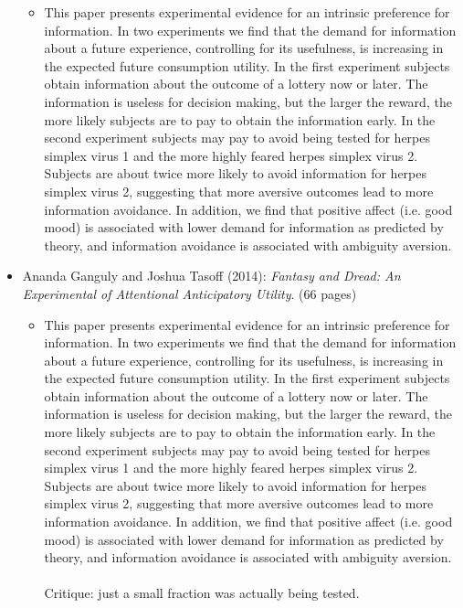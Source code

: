 \begin{itemize}
		\begin{itemize}
			\item This paper presents experimental evidence for an intrinsic preference for information. In two experiments we find that the demand for information about a future experience, controlling for its usefulness, is increasing in the expected future consumption utility. In the first experiment subjects obtain information about the outcome of a lottery now or later. The information is useless for decision making, but the larger the reward, the more likely subjects are to pay to obtain the information early. In the second experiment subjects may pay to avoid being tested for herpes simplex virus 1 and the more highly feared herpes simplex virus 2. Subjects are about twice more likely to avoid information for herpes simplex virus 2, suggesting that more aversive outcomes lead to more information avoidance. In addition, we find that positive affect (i.e. good mood) is associated with lower demand for information as predicted by theory, and information avoidance is associated with ambiguity aversion.
		\end{itemize}
	\item Ananda Ganguly and Joshua Tasoff (2014): \textit{Fantasy and Dread: An Experimental of Attentional Anticipatory Utility}. (66 pages)
		\begin{itemize}
			\item This paper presents experimental evidence for an intrinsic preference for information. In two experiments we find that the demand for information about a future experience, controlling for its usefulness, is increasing in the expected future consumption utility. In the first experiment subjects obtain information about the outcome of a lottery now or later. The information is useless for decision making, but the larger the reward, the more likely subjects are to pay to obtain the information early. In the second experiment subjects may pay to avoid being tested for herpes simplex virus 1 and the more highly feared herpes simplex virus 2. Subjects are about twice more likely to avoid information for herpes simplex virus 2, suggesting that more aversive outcomes lead to more information avoidance. In addition, we find that positive affect (i.e. good mood) is associated with lower demand for information as predicted by theory, and information avoidance is associated with ambiguity aversion. \\ \\
				
				Critique: just a small fraction was actually being tested. 
		\end{itemize}
\end{itemize}


\newpage